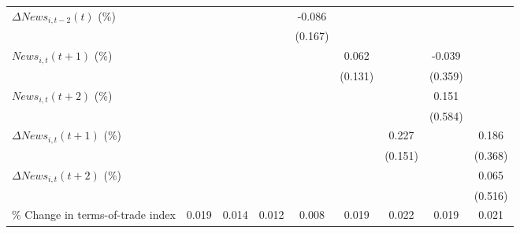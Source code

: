 {\begin{tabular}{l*{8}{c}}
\addlinespace
$ \Delta News_{i,t-2}(t)$ (\%)&                     &                     &                     &      -0.086         &                     &                     &                     &                     \\
                    &                     &                     &                     &     (0.167)         &                     &                     &                     &                     \\
\addlinespace
$ News_{i,t}(t+1)$ (\%)&                     &                     &                     &                     &       0.062         &                     &      -0.039         &                     \\
                    &                     &                     &                     &                     &     (0.131)         &                     &     (0.359)         &                     \\
\addlinespace
$ News_{i,t}(t+2)$ (\%)&                     &                     &                     &                     &                     &                     &       0.151         &                     \\
                    &                     &                     &                     &                     &                     &                     &     (0.584)         &                     \\
\addlinespace
$ \Delta News_{i,t}(t+1)$ (\%)&                     &                     &                     &                     &                     &       0.227         &                     &       0.186         \\
                    &                     &                     &                     &                     &                     &     (0.151)         &                     &     (0.368)         \\
\addlinespace
$ \Delta News_{i,t}(t+2)$ (\%)&                     &                     &                     &                     &                     &                     &                     &       0.065         \\
                    &                     &                     &                     &                     &                     &                     &                     &     (0.516)         \\
\addlinespace
\% Change in terms-of-trade index&       0.019         &       0.014         &       0.012         &       0.008         &       0.019         &       0.022         &       0.019         &       0.021         \\

\end{tabular}}
